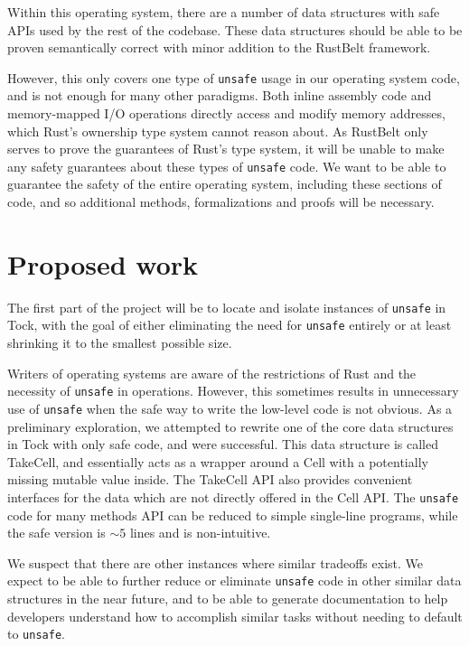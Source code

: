 \documentclass[12pt]{article}
\begin{document}
Within this operating system, there are a number of data structures with safe APIs used by the rest of the codebase. These data structures should be able to be proven semantically correct with minor addition to the RustBelt framework.

However, this only covers one type of \texttt{unsafe} usage in our operating system code, and is not enough for many other paradigms. Both inline assembly code and memory-mapped I/O operations directly access and modify memory addresses, which Rust's ownership type system cannot reason about. As RustBelt only serves to prove the guarantees of Rust's type system, it will be unable to make any safety guarantees about these types of \texttt{unsafe} code. We want to be able to guarantee the safety of the entire operating system, including these sections of code, and so additional methods, formalizations and proofs will be necessary.


\section{Proposed work}
The first part of the project will be to locate and isolate instances of \texttt{unsafe} in Tock, with the goal of either eliminating the need for \texttt{unsafe} entirely or at least shrinking it to the smallest possible size.

Writers of operating systems are aware of the restrictions of Rust and the necessity of \texttt{unsafe} in operations. However, this sometimes results in unnecessary use of \texttt{unsafe} when the safe way to write the low-level code is not obvious. As a preliminary exploration, we attempted to rewrite one of the core data structures in Tock with only safe code, and were successful. This data structure is called TakeCell, and essentially acts as a wrapper around a Cell with a potentially missing mutable value inside. The TakeCell API also provides convenient interfaces for the data which are not directly offered in the Cell API. The \texttt{unsafe} code for many methods API can be reduced to simple single-line programs, while the safe version is $\sim 5$ lines and is non-intuitive.

We suspect that there are other instances where similar tradeoffs exist. We expect to be able to further reduce or eliminate \texttt{unsafe} code in other similar data structures in the near future, and to be able to generate documentation to help developers understand how to accomplish similar tasks without needing to default to \texttt{unsafe}.
\end{document}
